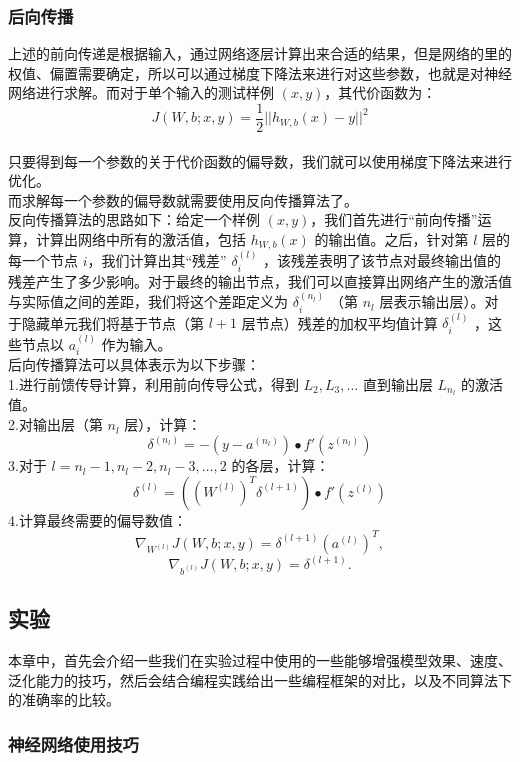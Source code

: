 \subsubsection{后向传播}\label{ux540eux5411ux4f20ux64ad}

上述的前向传递是根据输入，通过网络逐层计算出来合适的结果，但是网络的里的权值、偏置需要确定，所以可以通过梯度下降法来进行对这些参数，也就是对神经网络进行求解。而对于单个输入的测试样例
\((x,y)\)，其代价函数为：
\[J(W,b; x,y) = \frac{1}{2} || h_{W,b}(x) - y ||^2\]\\只要得到每一个参数的关于代价函数的偏导数，我们就可以使用梯度下降法来进行优化。\\而求解每一个参数的偏导数就需要使用反向传播算法了。\\反向传播算法的思路如下：给定一个样例
\((x,y)\)，我们首先进行``前向传播''运算，计算出网络中所有的激活值，包括
\(h_{W,b}(x)\) 的输出值。之后，针对第 \(l\) 层的每一个节点
\(i\)，我们计算出其``残差'' \(\delta^{(l)}_i\)
，该残差表明了该节点对最终输出值的残差产生了多少影响。对于最终的输出节点，我们可以直接算出网络产生的激活值与实际值之间的差距，我们将这个差距定义为
\(\delta^{(n_l)}_i\) （第 \(n_l\)
层表示输出层）。对于隐藏单元我们将基于节点（第 \(l+1\)
层节点）残差的加权平均值计算 \(\delta^{(l)}_i\) ，这些节点以
\(a^{(l)}_i\)
作为输入。\\后向传播算法可以具体表示为以下步骤：\\1.进行前馈传导计算，利用前向传导公式，得到
\(L_2, L_3, \ldots\) 直到输出层 \(L_{n_l}\) 的激活值。\\2.对输出层（第
\(n_l\) 层），计算：
\[\delta^{(n_l)} = - (y - a^{(n_l)}) \bullet f'(z^{(n_l)})\] 3.对于
\(l=n_l-1, n_l-2, n_l-3, \ldots, 2\) 的各层，计算：
\[\delta^{(l)} = \left((W^{(l)})^T \delta^{(l+1)}\right) \bullet f'(z^{(l)})\]
4.计算最终需要的偏导数值：
\[\nabla_{W^{(l)}} J(W,b;x,y) = \delta^{(l+1)}(a^{(l)})^T,\]
\[\nabla_{b^{(l)}} J(W,b;x,y) = \delta^{(l+1)}.\]

\subsection{实验}\label{ux5b9eux9a8c}

本章中，首先会介绍一些我们在实验过程中使用的一些能够增强模型效果、速度、泛化能力的技巧，然后会结合编程实践给出一些编程框架的对比，以及不同算法下的准确率的比较。

\subsubsection{神经网络使用技巧}\label{ux795eux7ecfux7f51ux7edcux4f7fux7528ux6280ux5de7}

